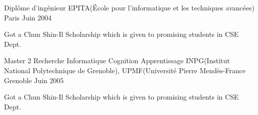 

\begin{cventries}

  \cventry
    {Diplôme d'ingénieur} %
    {EPITA(École pour l'informatique et les techniques avancées)} %
    {Paris} %
    {Juin 2004} %
    {
      \begin{cvitems} %
        \item {Got a Chun Shin-Il Scholarship which is given to promising students in CSE Dept.}
      \end{cvitems}
    }

  \cventry
    {Master 2 Recherche Informatique Cognition Apprentissage} %
    {INPG(Institut National Polytechnique de Grenoble), UPMF(Université Pierre Mendès-France} %
    {Grenoble} %
    {Juin 2005} %
    {
      \begin{cvitems} %
        \item {Got a Chun Shin-Il Scholarship which is given to promising students in CSE Dept.}
      \end{cvitems}
    }

\end{cventries}
